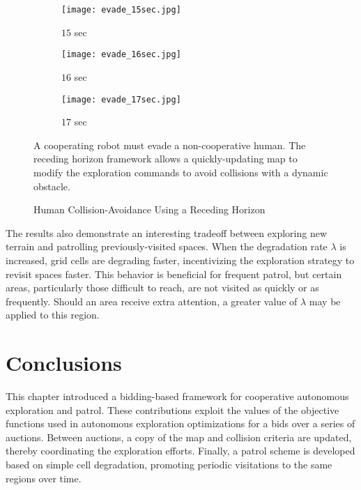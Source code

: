 \begin{figure}[!t]
\centering
    	\begin{subfigure}[t]{0.3\columnwidth}
           	\centering
          	\texttt{[image: evade\_15sec.jpg]}
        		\caption{$15$ sec}
    	\end{subfigure}
	\hspace*{0.02\textwidth}
    	\begin{subfigure}[t]{0.3\columnwidth}
           	\centering
          	\texttt{[image: evade\_16sec.jpg]}
        		\caption{$16$ sec}
    	\end{subfigure}
	\hspace*{0.02\textwidth}
    	\begin{subfigure}[t]{0.3\columnwidth}
           	\centering
          	\texttt{[image: evade\_17sec.jpg]}
        		\caption{$17$ sec}
    	\end{subfigure}
	\caption{Human Collision-Avoidance Using a Receding Horizon}
	\medskip
	\small
	A cooperating robot must evade a non-cooperative human. The receding horizon framework allows a quickly-updating map to modify the exploration commands to avoid collisions with a dynamic obstacle.
	\label{fig:EvadeHuman}
\end{figure}

The results also demonstrate an interesting tradeoff between exploring new terrain and patrolling previously-visited spaces. When the degradation rate $\lambda$ is increased, grid cells are degrading faster, incentivizing the exploration strategy to revisit spaces faster. This behavior is beneficial for frequent patrol, but certain areas, particularly those difficult to reach, are not visited as quickly or as frequently. Should an area receive extra attention, a greater value of $\lambda$ may be applied to this region.



\section{Conclusions}

This chapter introduced a bidding-based framework for cooperative autonomous exploration and patrol. These contributions exploit the values of the objective functions used in autonomous exploration optimizations for a bids over a series of auctions. Between auctions, a copy of the map and collision criteria are updated, thereby coordinating the exploration efforts. Finally, a patrol scheme is developed based on simple cell degradation, promoting periodic visitations to the same regions over time.



